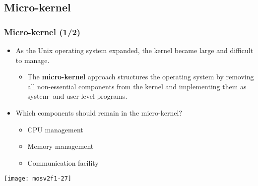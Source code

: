 \documentclass[CJKutf8,dvipsnames,table]{beamer}
\begin{document}
\begin{CJK*}{UTF8}{song}
  \subsection{Micro-kernel}

  \begin{frame}
    \frametitle{Micro-kernel (1/2)} \pause
    \begin{itemize}
    \item As the Unix operating system expanded, the kernel became large and difficult to manage.  \pause
      \begin{itemize}
      \item The \textbf{micro-kernel} approach structures the operating system by removing all non-essential components from the kernel and implementing them as system- and user-level programs.  \pause
      \end{itemize}
    \item Which components should remain in the micro-kernel?  \pause
      \begin{itemize}
      \item CPU management  \pause
      \item Memory management  \pause
      \item Communication facility  \pause
      \end{itemize}
    \end{itemize}
    \begin{center}
      \texttt{[image: mosv2f1-27]}
    \end{center}
  \end{frame}
  

\end{CJK*}
\end{document}
